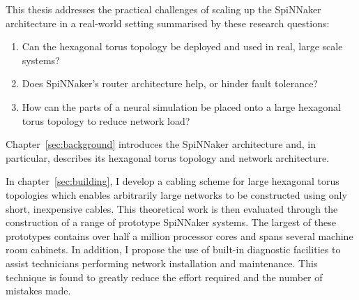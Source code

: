 This thesis addresses the practical challenges of scaling up the SpiNNaker
architecture in a real-world setting summarised by these research questions:

\begin{enumerate}
	
	\item Can the hexagonal torus topology be deployed and used in real, large
	scale systems?
	
	\item Does SpiNNaker's router architecture help, or hinder fault tolerance?
	
	\item How can the parts of a neural simulation be placed onto a large
	hexagonal torus topology to reduce network load?
	
\end{enumerate}

%

Chapter~\ref{sec:background} introduces the SpiNNaker architecture and, in
particular, describes its hexagonal torus topology and network architecture.

In chapter~\ref{sec:building}, I develop a cabling scheme for large hexagonal
torus topologies which enables arbitrarily large networks to be constructed
using only short, inexpensive cables. This theoretical work is then evaluated
through the construction of a range of prototype SpiNNaker systems. The largest
of these prototypes contains over half a million processor cores and spans
several machine room cabinets. In addition, I propose the use of built-in
diagnostic facilities to assist technicians performing network installation and
maintenance. This technique is found to greatly reduce the effort required and
the number of mistakes made.

